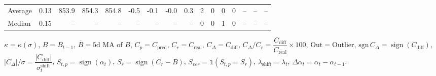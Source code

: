 \begin{threeparttable}
{\begin{tabular}{lrrrrrrrrrrrrrrr}
Average &     0.13 & 853.9 & 854.3 & 854.8 &       -0.5 &           -0.1 &                     -0.0 &                 0.3 &              2 &         0 &     0 &         0 &         -- &        -- &             -- \\
 Median &     0.15 &    -- &    -- &    -- &         -- &             -- &                       -- &                  -- &              0 &         0 &     1 &         0 &         -- &        -- &             -- \\
\bottomrule
\end{tabular}
}
\begin{tablenotes}\footnotesize
\item $\kappa=\kappa(\sigma)$, $B=B_{t-1}$, $\overline{B}=\text{5d MA of }B$, $C_p=C_{\text{pred}}$, $C_r=C_{\text{real}}$, $C_\Delta=C_{\text{diff}}$, $C_\Delta/C_r=\dfrac{C_{\text{diff}}}{C_{\text{real}}}\times100$, $\mathrm{Out}=\text{Outlier}$, $\mathrm{sgn}\,C_\Delta=\operatorname{sign}(C_{\text{diff}})$, $|C_\Delta|/\sigma=\dfrac{|C_{\text{diff}}|}{\sigma_t^{\text{shift}}}$, $S_{t,p}=\operatorname{sign}(\alpha_t)$, $S_r=\operatorname{sign}(C_r - B)$, $S_{ver}=\mathbb{1}(S_{t,p}=S_r)$, $\lambda_{\text{shift}}=\lambda_t$, $\Delta\alpha_t=\alpha_t-\alpha_{t-1}$.\end{tablenotes}
\end{threeparttable}
\endgroup

